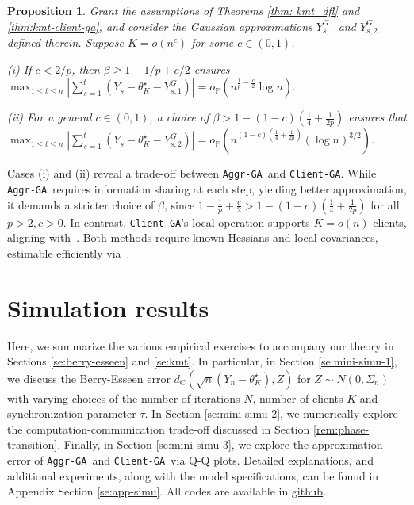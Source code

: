 \documentclass[a4paper,11pt]{article}
\numberwithin{equation}{section}
\theoremstyle{plain}
\newtheorem{proposition}{Proposition}
\theoremstyle{remark}
\newcommand{\minparam}{\theta^\star_K}
\newcommand{\IP}{\mathbb{P}}
\newcommand{\ag}{\texttt{Aggr-GA}}
\newcommand{\cg}{\texttt{Client-GA}}
\begin{document}
\begin{proposition} \label{prop:rem-kmt}
    Grant the assumptions of Theorems \ref{thm: kmt_dfl} and \ref{thm:kmt-client-ga}, and consider the Gaussian approximations $Y_{s,1}^G$ and $Y_{s,2}^G$ defined therein. Suppose $K=o(n^c)$ for some $c\in (0,1)$. 

    (i) If $c<2/p$, then $\beta \geq 1-1/p+c/2$ ensures
        $  \max_{1\leq t\leq n}|\sum_{s=1}^t(Y_s-\minparam - Y_{s,1}^G)| = o_{\IP}(n^{\frac{1}{p}- \frac{c}{2}}\log n).$
    
    (ii) For a general $c \in (0,1)$, a choice of $\beta > 1 - (1-c)(\frac{1}{4}+ \frac{1}{2p})$ ensures that
        $ \max_{1\leq t\leq n}|\sum_{s=1}^t(Y_s-\minparam - Y_{s,2}^G)| = o_{\IP}(n^{(1-c)(\frac{1}{4}+ \frac{1}{2p})} (\log n)^{3/2}). $
\end{proposition}   
Cases (i) and (ii) reveal a trade-off between \ag\ and \cg. While \ag\ requires information sharing at each step, yielding better approximation, it demands a stricter choice of $\beta$, since $1-\frac{1}{p}+\frac{c}{2} > 1 - (1-c)(\frac{1}{4}+ \frac{1}{2p})$ for all $p>2, c>0$. In contrast, \cg's local operation supports $K=o(n)$ clients, aligning with~\cite{duchijmlr2013,guchen2023}. Both methods require known Hessians and local covariances, estimable efficiently via~\cite{songxichen2024}.
\section{Simulation results} \label{se:simu}
Here, we summarize the various empirical exercises to accompany our theory in Sections \ref{se:berry-esseen} and \ref{se:kmt}. In particular, in Section \ref{se:mini-simu-1}, we discuss the Berry-Esseen error $d_{\mathrm{C}}(\sqrt{n}(\bar{Y}_n - \minparam), Z)$ for $Z \sim N(0, \Sigma_n)$ with varying choices of the number of iterations $N$, number of clients $K$ and synchronization parameter $\tau$. In Section \ref{se:mini-simu-2}, we numerically explore the computation-communication trade-off discussed in Section \ref{rem:phase-transition}. Finally, in Section \ref{se:mini-simu-3}, we explore the approximation error of \ag\ and \cg\ via Q-Q plots. Detailed explanations, and additional experiments, along with the model specifications, can be found in Appendix Section \ref{se:app-simu}. All codes are available in \href{https://github.com/sohamb01/DFL-GA}{github}.   
\end{document}
